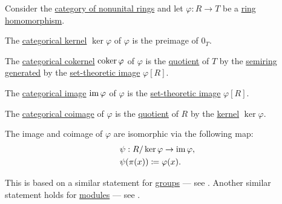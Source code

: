 \begin{proposition}\label{thm:ring_zero_morphisms}
  Consider the \hyperref[def:ring/category]{category of nonunital rings} and let \( \varphi: R \to T \) be a \hyperref[def:ring/homomorphism]{ring homomorphism}.

  \begin{thmenum}
     The \hyperref[def:zero_morphisms/kernel]{categorical kernel} \( \ker \varphi \) of \( \varphi \) is the preimage of \( 0_T \).

     The \hyperref[def:zero_morphisms/kernel]{categorical cokernel} \( \operatorname*{co\negthinspace\ker} \varphi \) of \( \varphi \) is the \hyperref[def:group/quotient]{quotient} of \( T \) by the \hyperref[def:semiring_ideal/generated]{semiring generated} by the \hyperref[def:set_valued_map/image]{set-theoretic image} \( \varphi[R] \).

     The \hyperref[def:zero_morphisms/image]{categorical image} \( \operatorname{im} \varphi \) of \( \varphi \) is the \hyperref[def:set_valued_map/image]{set-theoretic image} \( \varphi[R] \).

     The \hyperref[def:zero_morphisms/coimage]{categorical coimage} of \( \varphi \) is the \hyperref[def:ring/quotient]{quotient} of \( R \) by the \hyperref[def:ring/kernel]{kernel} \( \ker \varphi \).

     The image and coimage of \( \varphi \) are isomorphic via the following map:
    \begin{equation}\label{eq:thm:ring_zero_morphisms/isomorphism}
      \begin{aligned}
        &\psi: R / \ker \varphi \to \operatorname{im} \varphi, \\
        &\psi(\pi(x)) \coloneqq \varphi(x).
      \end{aligned}
    \end{equation}
  \end{thmenum}
\end{proposition}
\begin{comments}
  \item This is based on a similar statement for \hyperref[def:group]{groups} --- see . Another similar statement holds for \hyperref[def:module]{modules} --- see .
\end{comments}
